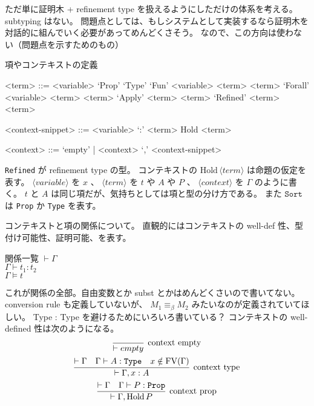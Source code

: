 ただ単に証明木 + refinement type を扱えるようにしただけの体系を考える。
subtyping はない。
問題点としては、もしシステムとして実装するなら証明木を対話的に組んでいく必要があってめんどくさそう。
なので、この方向は使わない（問題点を示すためのもの）

\begin{itembox}[l]{項やコンテキストの定義}
\begin{grammar}
<term> ::= <variable> 
\alt `Prop'
\alt `Type'
\alt `Fun' <variable> <term> <term>
\alt `Forall' <variable> <term> <term>
\alt `Apply' <term> <term>
\alt `Refined' <term> <term>

<context-snippet> ::= <variable> `:' <term>
\alt Hold <term>

<context> ::= `empty' | <context> `,' <context-snippet>
\end{grammar}
\end{itembox}

\texttt{Refined} が refinement type の型。
コンテキストの \(\text{Hold} \, \langle term \rangle\) は命題の仮定を表す。
\(\langle variable \rangle\) を \(x\) 、 \(\langle term \rangle\) を \(t\) や \(A\) や \(P\) 、 \(\langle context \rangle\) を \(\Gamma\) 
のように書く。
\(t\) と \(A\) は同じ項だが、気持ちとしては項と型の分け方である。
また \(\texttt{Sort}\) は \texttt{Prop} か \texttt{Type} を表す。

コンテキストと項の関係について。
直観的にはコンテキストの well-def 性、型付け可能性、証明可能、を表す。
\begin{itembox}[l]{関係一覧}
  \(\vdash \Gamma \) \\
  \(\Gamma \vdash t_1 : t_2\) \\
  \(\Gamma \vDash t \) \\
\end{itembox}
これが関係の全部。自由変数とか subst とかはめんどくさいので書いてない。 conversion rule も定義していないが、 \(M_1 \equiv_{\beta} M_2\) みたいなのが定義されていてほしい。
Type : Type を避けるためにいろいろ書いている？
コンテキストの well-defined 性は次のようになる。
\begin{gather*}
  \infer[\text{context empty}]{\vdash empty}{} \\
  \infer[\text{context type}]{\vdash \Gamma , x : A}{\vdash \Gamma & \Gamma \vdash A : \texttt{Type} & x \notin \text{FV}(\Gamma)} \\
  \infer[\text{context prop}]{\vdash \Gamma , \text{Hold} \, P}{\vdash \Gamma & \Gamma \vdash P : \texttt{Prop}} \\
\end{gather*}

